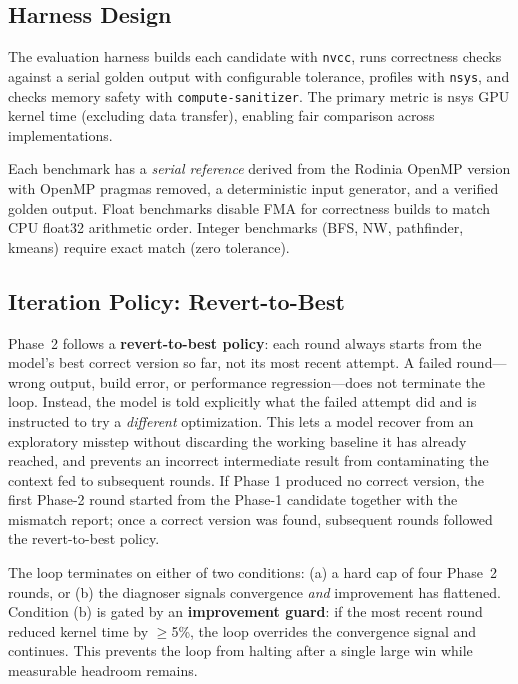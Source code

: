 \documentclass[conference]{IEEEtran}
\begin{document}
\subsection{Harness Design}

The evaluation harness builds each candidate with \texttt{nvcc}, runs
correctness checks against a serial golden output with configurable
tolerance, profiles with \texttt{nsys}, and checks memory safety with
\texttt{compute-sanitizer}.
The primary metric is nsys GPU kernel time (excluding data transfer), enabling
fair comparison across implementations.

Each benchmark has a \emph{serial reference} derived from the Rodinia OpenMP
version with OpenMP pragmas removed, a deterministic input generator, and a
verified golden output. Float benchmarks disable FMA for correctness builds to
match CPU float32 arithmetic order. Integer benchmarks (BFS, NW, pathfinder,
kmeans) require exact match (zero tolerance).

\subsection{Iteration Policy: Revert-to-Best}

Phase~2 follows a \textbf{revert-to-best policy}: each round always starts from
the model's best correct version so far, not its most recent attempt. A failed
round---wrong output, build error, or performance regression---does not
terminate the loop. Instead, the model is told explicitly what the failed
attempt did and is instructed to try a \emph{different} optimization. This lets
a model recover from an exploratory misstep without discarding the working
baseline it has already reached, and prevents an incorrect intermediate result
from contaminating the context fed to subsequent rounds. If Phase 1 produced no 
correct version, the first Phase-2 round started from the Phase-1 candidate 
together with the mismatch report; once a correct version was found, subsequent 
rounds followed the revert-to-best policy.

The loop terminates on either of two conditions: (a) a hard cap of four Phase~2
rounds, or (b) the diagnoser signals convergence \emph{and} improvement has
flattened. Condition (b) is gated by an \textbf{improvement guard}: if the most
recent round reduced kernel time by $\geq$5\%, the loop overrides the
convergence signal and continues. This prevents the loop from halting after a
single large win while measurable headroom remains.
\end{document}
